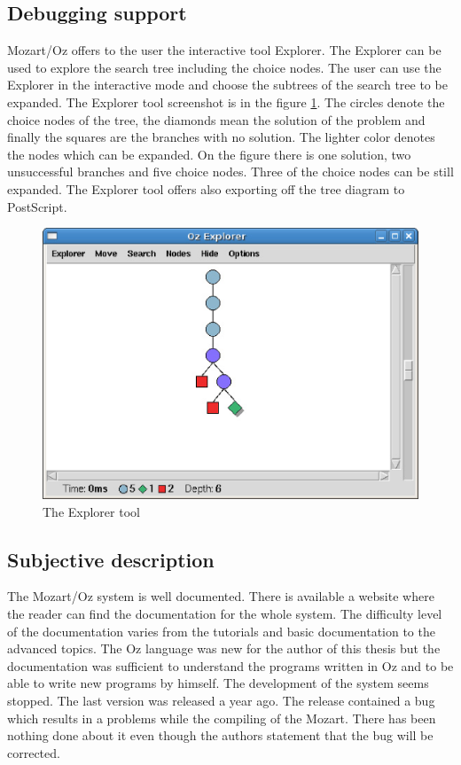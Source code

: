 \subsection{Debugging support}
Mozart/Oz offers to the user the interactive tool Explorer. The Explorer can be used to explore 
the search tree including the choice nodes. The user can use the Explorer in the 
interactive mode and choose the subtrees of the search tree to be expanded. 
 The Explorer tool screenshot is in the figure \ref{mozart:explorer}. The circles 
 denote the choice nodes of the tree, the diamonds mean the solution of
 the problem and finally the squares are the branches with no solution. The lighter color
 denotes the nodes which can be expanded. On the figure there is one solution, two 
 unsuccessful branches and five choice nodes. Three of the choice nodes can be still expanded.
 The Explorer tool offers also exporting off the tree diagram to PostScript.

\begin{figure}
\caption{\label{mozart:explorer}The Explorer tool}
\begin{center}
\includegraphics[scale=0.3]{images/screenshoty/explorer.eps}
\end{center}
\end{figure}


\subsection{Subjective description}
The Mozart/Oz system is well documented. There is available a website \cite{mozart:documentation} where the reader
can find the documentation for the whole system. The difficulty level of the documentation
varies from the tutorials and basic documentation to the advanced topics. The Oz language 
was new for the author of this thesis but the documentation was sufficient 
to understand the programs written in Oz and to be able to write new programs by
himself. The development of the system seems stopped. The last version was released
a year ago. The release contained a bug which results in a problems while the compiling
of the Mozart. There has been nothing done about it even though the authors statement
that the bug will be corrected.